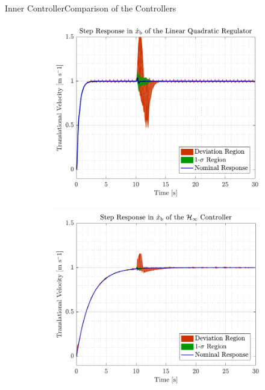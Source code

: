 \begin{frame}{Inner Controller}{Comparison of the Controllers}
\begin{figure}[H]
  \begin{minipage}{0.45\linewidth}
    \begin{figure}[H]
      \centering
      \includegraphics[width=1\linewidth]{figures/xbdot_mc_lqr}
    \end{figure}        
  \end{minipage}\hfill      
  \begin{minipage}{0.45\linewidth}
    \begin{figure}[H]
      \centering
      \includegraphics[width=1\linewidth]{figures/xbdot_mc_rob}
    \end{figure}                
  \end{minipage}\hfill \\
\end{figure}
\end{frame}




